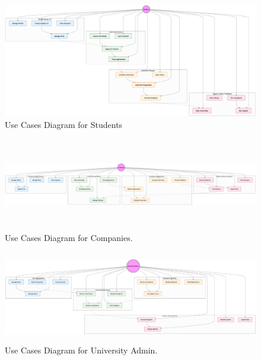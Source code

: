 \begin{figure}[H]
    \begin{center}
        \includegraphics[width=1.15\linewidth]{JhaBhatiaSharma/Images/Use Case Diagrams/Student.png}
        \caption{Use Cases Diagram for Students}
        \label{fig:EducatorUC}%
    \end{center}
\end{figure}



\begin{figure}[H]
    \begin{center}
        \includegraphics[width=\dimexpr\paperwidth-2cm\relax, height=4cm]{JhaBhatiaSharma/Images/Use Case Diagrams/Company.png}
        \caption{Use Cases Diagram for Companies.}
        \label{fig:CompanyUC}%
    \end{center}
\end{figure}

\begin{figure}[H]
    \begin{center}
        \includegraphics[width=1.1\linewidth, height=4cm]{JhaBhatiaSharma/Images/Use Case Diagrams/Admin.png}
        \caption{Use Cases Diagram for University Admin.}
        \label{fig:AdminUC}%
    \end{center}
\end{figure}

